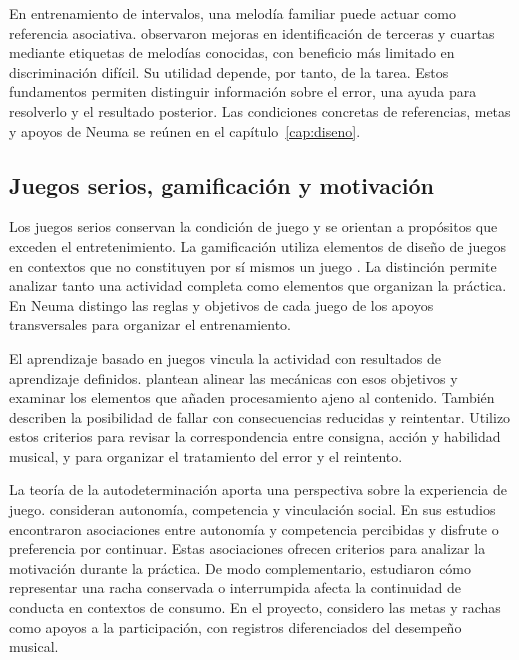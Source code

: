 En entrenamiento de intervalos, una melodía familiar puede actuar como referencia
asociativa. \textcite{smith1994familiar} observaron mejoras en identificación de
terceras y cuartas mediante etiquetas de melodías conocidas, con beneficio más
limitado en discriminación difícil. Su utilidad depende, por tanto, de la tarea.
Estos fundamentos permiten distinguir información sobre el error, una ayuda para
resolverlo y el resultado posterior. Las condiciones concretas de referencias,
metas y apoyos de Neuma se reúnen en el capítulo~\ref{cap:diseno}.

\subsection{Juegos serios, gamificación y motivación}
\label{sec:juegos-serios-gamificacion}
\label{sec:mecanicas-aprendizaje}
\label{sec:motivacion-autonomia}
\label{sec:metas-constancia}
\label{sec:evidencia-gamificacion}
Los juegos serios conservan la condición de juego y se orientan a propósitos que
exceden el entretenimiento. La gamificación utiliza elementos de diseño de juegos
en contextos que no constituyen por sí mismos un juego
\parencite{deterding2011gamification}. La distinción permite analizar tanto una
actividad completa como elementos que organizan la práctica. En Neuma distingo
las reglas y objetivos de cada juego de los apoyos transversales para organizar
el entrenamiento.

El aprendizaje basado en juegos vincula la actividad con resultados de aprendizaje
definidos. \textcite{plass2015foundations} plantean alinear las mecánicas con esos
objetivos y examinar los elementos que añaden procesamiento ajeno al contenido.
También describen la posibilidad de fallar con consecuencias reducidas y reintentar.
Utilizo estos criterios para revisar la correspondencia entre consigna, acción
y habilidad musical, y para organizar el tratamiento del error y el reintento.

La teoría de la autodeterminación aporta una perspectiva sobre la experiencia de
juego. \textcite{ryan2006motivation} consideran autonomía, competencia y vinculación
social. En sus estudios encontraron asociaciones entre autonomía y competencia
percibidas y disfrute o preferencia por continuar. Estas asociaciones ofrecen
criterios para analizar la motivación durante la práctica. De modo complementario,
\textcite{silverman2023streaks} estudiaron cómo representar una racha conservada o
interrumpida afecta la continuidad de conducta en contextos de consumo. En el
proyecto, considero las metas y rachas como apoyos a la participación, con registros
diferenciados del desempeño musical.

